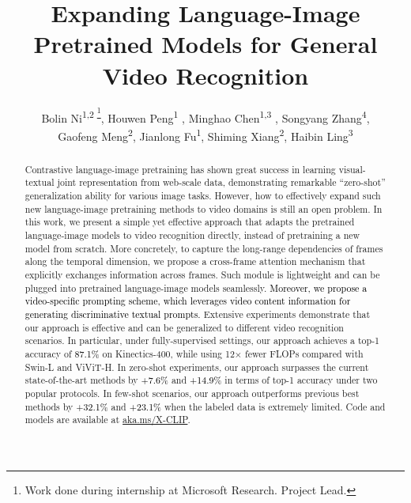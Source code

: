 \documentclass[runningheads]{llncs}
\newcommand*\samethanks[1][\value{footnote}]{\footnotemark[#1]}
\begin{document}
\pagestyle{headings}
\mainmatter
\def\ECCVSubNumber{1398}  

\title{Expanding Language-Image Pretrained Models for General Video Recognition}



\author{
    Bolin Ni\textsuperscript{1,2 \thanks{Work done during internship at Microsoft Research.  Project Lead.}},
    Houwen Peng\textsuperscript{1 },
    Minghao Chen\textsuperscript{1,3 \samethanks},
    Songyang Zhang\textsuperscript{4}, \\
    Gaofeng Meng\textsuperscript{2}, 
    Jianlong Fu\textsuperscript{1},
    Shiming Xiang\textsuperscript{2},
    Haibin Ling\textsuperscript{3}
}



\maketitle

\begin{abstract}
Contrastive language-image pretraining has shown great success in learning visual-textual joint representation from web-scale data, demonstrating remarkable “zero-shot” generalization ability for various image tasks. However, how to effectively expand such new language-image pretraining methods to video domains is still an open problem. In this work, we present a simple yet effective approach that adapts the pretrained language-image models to video recognition directly, instead of pretraining a new model from scratch. More concretely, to capture the long-range dependencies of frames along the temporal dimension, we propose a cross-frame attention mechanism that explicitly exchanges information across  frames. Such module is lightweight and can be plugged into pretrained language-image models  seamlessly. 
\textcolor{black}{Moreover, we propose a video-specific prompting scheme, which leverages video content information for generating discriminative textual prompts.} Extensive experiments demonstrate that our approach is effective and can be  generalized to different video recognition scenarios. In particular, under fully-supervised settings, our approach achieves a top-1 accuracy of \textcolor{black}{87.1\%} on Kinectics-400, while using 12× fewer FLOPs compared with Swin-L and ViViT-H. In zero-shot experiments, our approach surpasses the current state-of-the-art methods by \textcolor{black}{+7.6\%} and \textcolor{black}{+14.9\%} in terms of top-1 accuracy under two popular protocols. In few-shot scenarios, our approach outperforms previous best methods by \textcolor{black}{+32.1\%} and \textcolor{black}{+23.1\%} when the labeled data is extremely limited. Code and models are available at \href{https://github.com/microsoft/VideoX/tree/master/X-CLIP}{aka.ms/X-CLIP}.
\end{abstract}
\end{document}
